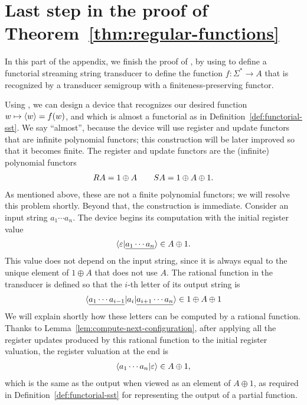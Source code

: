\section{Last step in the proof of Theorem~\ref{thm:regular-functions}}
In this part of the appendix, we finish the proof of , by using  to define a functorial streaming string transducer to define the function $f : \Sigma^* \to A$ that is recognized by a transducer semigroup with a finiteness-preserving functor. 

Using , we can design a device that  recognizes our desired function $w \mapsto \langle w \rangle=f(w)$, and which is almost a functorial \sst as in Definition~\ref{def:functorial-sst}. We say ``almost'', because the device will use register and update functors that are  infinite polynomial functors; this construction will be later improved so that it becomes finite.  The register and update functors are the (infinite) polynomial functors
\begin{align*}
\functorr A  = 1 \oplus A \qquad \functors A = 1 \oplus A \oplus 1.
\end{align*}
As mentioned above, these are  not a finite polynomial functors; we will resolve this problem shortly.  
Beyond that, the construction is immediate. Consider an input string 
$a_1 \cdots a_n$. The device begins its computation with the  initial register value 
\begin{align*}
    \langle \varepsilon | \underline{a_1 \cdots a_n} \rangle \in A \oplus 1.
\end{align*}
This value does not depend on the input string, since it is always equal to the unique element of $1 \oplus A$ that does not use $A$.
The rational function  in the transducer is defined so that the $i$-th letter of its output string is 
\begin{align*}
\langle \underline{a_1 \cdots a_{i-1}}|a_i| \underline{a_{i+1} \cdots a_n} \rangle \in 1 \oplus A \oplus 1
\end{align*}
We will explain shortly how these letters  can be computed by a rational function.
Thanks to Lemma~\ref{lem:compute-next-configuration}, after applying all the register updates produced by this rational function to the initial register valuation, the register valuation at the end is 
\begin{align*}
    \langle a_1 \cdots a_n | \varepsilon \rangle \in A \oplus 1,
\end{align*}
which is the same as the output when viewed as an element of $A \oplus 1$,
as required in Definition~\ref{def:functorial-sst}  for representing the output of a partial function.

